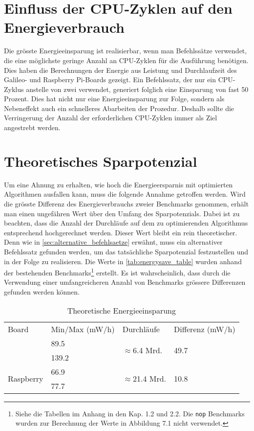 \section{Einfluss der CPU-Zyklen auf den Energieverbrauch}
Die grösste Energieeinsparung ist realisierbar, wenn man Befehlssätze verwendet, die eine möglichste geringe Anzahl an CPU-Zyklen für die Ausführung benötigen. Dies haben die Berechnungen der Energie aus Leistung und Durchlaufzeit   des Galileo- und Raspberry Pi-Boards gezeigt. Ein Befehlssatz, der nur ein CPU-Zyklus anstelle von zwei verwendet, generiert folglich eine Einsparung von fast 50 Prozent. Dies hat nicht nur eine Energieeinsparung zur Folge, sondern als Nebeneffekt auch ein schnelleres Abarbeiten der Prozedur. Deshalb sollte die Verringerung der Anzahl der erforderlichen CPU-Zyklen immer als Ziel angestrebt werden.

\section{Theoretisches Sparpotenzial}
Um eine Ahnung zu erhalten, wie hoch die Energieersparnis mit optimierten Algorithmen ausfallen kann, muss die folgende Annahme getroffen werden. Wird die grösste Differenz des Energieverbrauchs zweier Benchmarks genommen, erhält man einen ungefähren Wert über den Umfang des Sparpotenzials. Dabei ist zu beachten, dass die Anzahl der Durchläufe auf dem zu optimierenden Algorithmus entsprechend hochgerechnet werden. Dieser Wert bleibt ein rein theoretischer. Denn wie in \autoref{sec:alternative_befehlsaetze} erwähnt, muss ein alternativer Befehlssatz gefunden werden, um das tatsächliche Sparpotenzial festzustellen und in der Folge zu realisieren. Die Werte in \autoref{tab:energysave_table} wurden anhand der bestehenden Benchmarks\footnote{Siehe die Tabellen im Anhang in den Kap. 1.2 und 2.2. Die \texttt{nop} Benchmarks wurden zur Berechnung der Werte in Abbildung 7.1 nicht verwendet.} erstellt. Es ist wahrscheinlich, dass durch die Verwendung einer umfangreicheren Anzahl von Benchmarks grössere Differenzen gefunden werden können.


\begin{table}[H]
\center
\begin{tabular}{ |l|l|l|l| }
\hline
Board & Min/Max (mW/h) & Durchläufe & Differenz (mW/h) \\ \hhline{|=|=|=|=|}
\multirow{2}{*}{Galileo} & 89.5 & \multirow{2}{*}{$\approx$6.4 Mrd.} & \multirow{2}{*}{49.7} \\ 
 & 139.2 & &  \\ \hline
\multirow{2}{*}{Raspberry} & 66.9 & \multirow{2}{*}{$\approx$21.4 Mrd.} & \multirow{2}{*}{10.8} \\ 
 & 77.7 & &  \\
\hline
\end{tabular}
\caption{Theoretische Energieeinsparung}
\label{tab:energysave_table}
\end{table}



